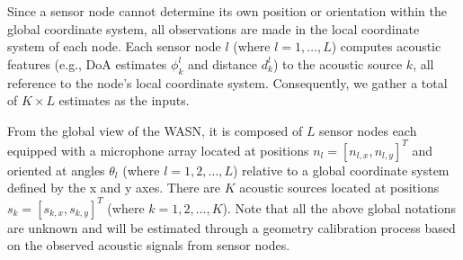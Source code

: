 Since a sensor node cannot determine its own position or orientation within the global coordinate system, all observations are made in the local coordinate system of each node. 
Each sensor node \( l \) (where \( l = 1, \ldots, L \)) computes acoustic features (e.g., DoA estimates \( \phi_k^l \) and distance \( d_k^l \)) to the acoustic source \( k \), all reference to the node's local coordinate system. Consequently, we gather a total of \( K \times L \) estimates as the inputs.

From the global view of the WASN, it is composed of \( L \) sensor nodes each equipped with a microphone array located at positions \( n_l = [n_{l,x}, n_{l,y}]^T \) and oriented at angles \( \theta_l \) (where \( l = 1, 2, \ldots, L \)) relative to a global coordinate system defined by the x and y axes. There are \( K \) acoustic sources located at positions \( s_k = [s_{k,x}, s_{k,y}]^T \) (where \( k = 1, 2, \ldots, K \)). Note that all the above global notations are unknown and will be estimated through a geometry calibration process based on the observed acoustic signals from sensor nodes.



